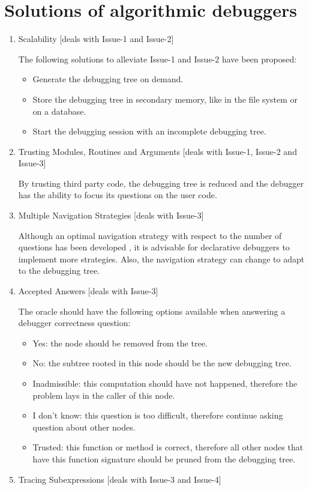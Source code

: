 \section{Solutions of algorithmic debuggers}
\begin{enumerate}
    \item Scalability [deals with Issue-1 and Issue-2]
    
The following solutions to alleviate Issue-1 and Issue-2 have been proposed:
\begin{itemize}
    \item Generate the debugging tree on demand.
    \item Store the debugging tree in secondary memory, like in the file system or on a database.
    \item Start the debugging session with an incomplete debugging tree.
\end{itemize}
    \item Trusting Modules, Routines and Arguments [deals with Issue-1, Issue-2 and Issue-3]
    
By trusting third party code, the debugging tree is reduced and the debugger has the ability to focus its questions on the user code.
    \item Multiple Navigation Strategies [deals with Issue-3]
    
Although an optimal navigation strategy with respect to the number of questions has been developed \cite{optimal_strategy}, it is advisable for declarative debuggers to implement more strategies.
Also, the navigation strategy can change to adapt to the debugging tree.

\item Accepted Answers [deals with Issue-3]

The oracle should have the following options available when answering a debugger correctness question:
\begin{itemize}
    \item Yes: the node should be removed from the tree.
    \item No: the subtree rooted in this node should be the new debugging tree.
    \item Inadmissible: this computation should have not happened, therefore the problem lays in the caller of this node.
    \item I don't know: this question is too difficult, therefore continue asking question about other nodes.
    \item Trusted: this function or method is correct, therefore all other nodes that have this function signature should be pruned from the debugging tree.
\end{itemize}
\item Tracing Subexpressions [deals with Issue-3 and Issue-4]


\end{enumerate}

